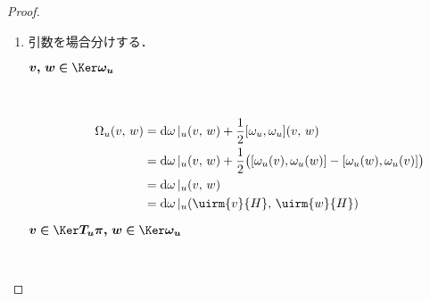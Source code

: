 \documentclass[TQFT_main]{subfiles}
\begin{document}
\begin{proof}
    \begin{enumerate}
        \item 引数を場合分けする．
        \begin{description}
            \item[\textbf{$\bm{v,\, w \in \Ker \omega_u}$}]　
            
            \begin{align}
                \Omega_u (v,\, w) 
                &= \dd{\omega}|_u (v,\, w) + \frac{1}{2} \comm{\omega_u}{\omega_u} (v,\, w) \\
                &= \dd{\omega}|_u (v,\, w) + \frac{1}{2} \bigl(\comm{\omega_u(v)}{\omega_u(w)} - \comm{\omega_u(w)}{\omega_u(v)}\bigr) \\
                &= \dd{\omega}|_u (v,\, w) \\
                &= \dd{\omega}|_u (\uirm{v}{H},\, \uirm{w}{H})
            \end{align}
            
            \item[\textbf{$\bm{v \in \Ker T_u \pi,\, w \in \Ker \omega_u}$}]　
            

\end{description}
\end{enumerate}
\end{proof}
\end{document}
